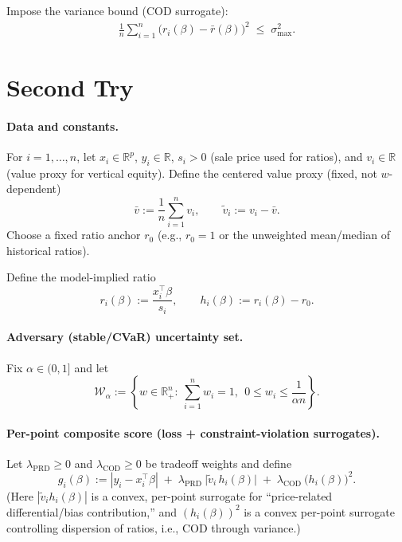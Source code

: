 \documentclass[11pt]{article}
\theoremstyle{plain}
\theoremstyle{definition}
\newcommand{\1}{\mathbf{1}}
\begin{document}
Impose the variance bound (COD surrogate):
\begin{align}
\frac{1}{n}\sum_{i=1}^n \big(r_i(\beta)-\bar r(\beta)\big)^2 \;\le\; \sigma_{\max}^2.
\label{eq:var}
\end{align}


\section{Second Try}

%
%

\paragraph{Data and constants.}
For $i=1,\dots,n$, let $x_i\in\mathbb{R}^p$, $y_i\in\mathbb{R}$, $s_i>0$ (sale price used for ratios),
and $v_i\in\mathbb{R}$ (value proxy for vertical equity).
Define the centered value proxy (fixed, not $w$-dependent)
\[
\bar v := \frac{1}{n}\sum_{i=1}^n v_i,
\qquad
\tilde v_i := v_i - \bar v.
\]
Choose a fixed ratio anchor $r_0$ (e.g., $r_0=1$ or the unweighted mean/median of historical ratios).

Define the model-implied ratio
\[
r_i(\beta) := \frac{x_i^\top \beta}{s_i},
\qquad
h_i(\beta) := r_i(\beta) - r_0.
\]

\paragraph{Adversary (stable/CVaR) uncertainty set.}
Fix $\alpha\in(0,1]$ and let
\[
\mathcal{W}_\alpha := \left\{w\in\mathbb{R}_+^n:\ \sum_{i=1}^n w_i = 1,\ \ 0\le w_i \le \frac{1}{\alpha n}\right\}.
\]

\paragraph{Per-point composite score (loss + constraint-violation surrogates).}
Let $\lambda_{\mathrm{PRD}}\ge 0$ and $\lambda_{\mathrm{COD}}\ge 0$ be tradeoff weights and define
\[
g_i(\beta)
:= |y_i - x_i^\top \beta|
\;+\;
\lambda_{\mathrm{PRD}}\ \big|\tilde v_i\, h_i(\beta)\big|
\;+\;
\lambda_{\mathrm{COD}}\ \big(h_i(\beta)\big)^2.
\]
(Here $|\tilde v_i h_i(\beta)|$ is a convex, per-point surrogate for “price-related differential/bias contribution,”
and $(h_i(\beta))^2$ is a convex per-point surrogate controlling dispersion of ratios, i.e., COD through variance.)
\end{document}
